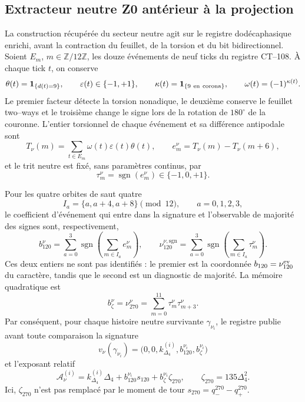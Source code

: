 \subsection{Extracteur neutre Z0 antérieur à la projection}
\label{sec:extractor-neutro-z0-torsion-rev2}

La construction récupérée du secteur neutre agit sur le registre
dodécaphasique enrichi, avant la contraction du feuillet, de la torsion et du bit
bidirectionnel. Soient \(E_m\), \(m\in\mathbb Z/12\mathbb Z\), les douze
événements de neuf ticks du registre CT--108. À chaque tick \(t\), on conserve
\[
 \theta(t)=\mathbf1_{\{d(t)=9\}},\qquad
 \varepsilon(t)\in\{-1,+1\},\qquad
 \kappa(t)=\mathbf1_{\{9\ {\rm en\ corona}\}},
 \qquad \omega(t)=(-1)^{\kappa(t)}.
\]
Le premier facteur détecte la torsion nonadique, le deuxième conserve le feuillet
two--ways et le troisième change le signe lors de la rotation de \(180^\circ\) de la
couronne. L'entier torsionnel de chaque événement et sa différence antipodale sont
\begin{equation}
 T_\nu(m)=\sum_{t\in E_m}
   \omega(t)\varepsilon(t)\theta(t),\qquad
 e_m^\nu=T_\nu(m)-T_\nu(m+6),
 \label{eq:extractor-z0-torsion-antipodal-rev2}
\end{equation}
et le trit neutre est fixé, sans paramètres continus, par
\begin{equation}
 \tau_m^\nu=\operatorname{sgn}(e_m^\nu)
 \in\{-1,0,+1\}.
 \label{eq:trit-neutro-torsion-antipodal-rev2}
\end{equation}

Pour les quatre orbites de saut quatre
\[
 I_a=\{a,a+4,a+8\}\pmod{12},\qquad a=0,1,2,3,
\]
le coefficient d'événement qui entre dans la signature et l'observable de majorité
des signes sont, respectivement,
\begin{equation}
 b_{120}^\nu
 =\sum_{a=0}^{3}\operatorname{sgn}
   \left(\sum_{m\in I_a}e_m^\nu\right),
 \qquad
 \nu_{120}^{\nu,\mathrm{sgn}}
 =\sum_{a=0}^{3}\operatorname{sgn}
   \left(\sum_{m\in I_a}\tau_m^\nu\right).
 \label{eq:canales-120-neutros-distintos-rev2}
\end{equation}
Ces deux entiers ne sont pas identifiés : le premier est la coordonnée
\(b_{120}=\nu_{120}^{\rm ev}\) du caractère, tandis que le second est un
diagnostic de majorité. La mémoire quadratique est
\begin{equation}
 b_\zeta^\nu=\nu_{270}^\nu
 =\sum_{m=0}^{11}\tau_m^\nu\tau_{m+3}^\nu.
 \label{eq:canal-270-neutro-rev2}
\end{equation}
Par conséquent, pour chaque histoire neutre survivante
\(\gamma_{\nu_i}\), le registre publie avant toute comparaison la signature
\[
 v_\nu(\gamma_{\nu_i})
 =\bigl(0,0,k_{\Delta_4}^{(i)},b_{120}^{\nu_i},
        b_\zeta^{\nu_i}\bigr)
\]
et l'exposant relatif
\begin{equation}
 \mathcal A_\nu^{(i)}
 =k_{\Delta_4}^{(i)}\Delta_4
  +b_{120}^{\nu_i}s_{120}
  +b_\zeta^{\nu_i}\zeta_{270},
 \qquad
 \zeta_{270}=135\Delta_4^2.
 \label{eq:caracter-relativo-neutro-z0-rev2}
\end{equation}
Ici, \(\zeta_{270}\) n'est pas remplacé par le moment de tour
\(s_{270}=q_-^{270}-q_+^{270}\).

